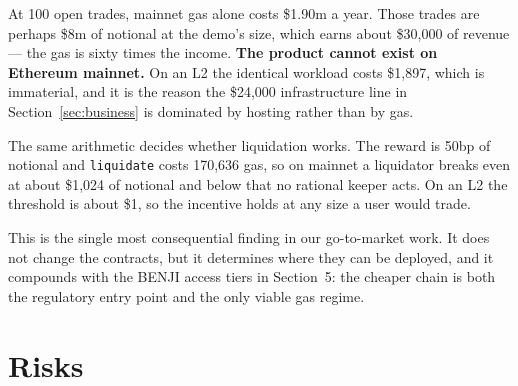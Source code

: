 \documentclass[11pt,a4paper]{article}
\begin{document}
At 100 open trades, mainnet gas alone costs \$1.90m a year. Those trades are perhaps \$8m of
notional at the demo's size, which earns about \$30{,}000 of revenue — the gas is sixty times the
income. \textbf{The product cannot exist on Ethereum mainnet.} On an L2 the identical workload costs
\$1,897, which is immaterial, and it is the reason the \$24{,}000 infrastructure line in
Section~\ref{sec:business} is dominated by hosting rather than by gas.

The same arithmetic decides whether liquidation works. The reward is 50bp of notional and
\texttt{liquidate} costs 170,636 gas, so on mainnet a liquidator breaks even at about \$1{,}024 of
notional and below that no rational keeper acts. On an L2 the threshold is about \$1, so the
incentive holds at any size a user would trade.

This is the single most consequential finding in our go-to-market work. It does not change the
contracts, but it determines where they can be deployed, and it compounds with the BENJI access tiers
in Section~5: the cheaper chain is both the regulatory entry point and the only viable gas regime.

\section{Risks}\label{sec:risks}
\end{document}
